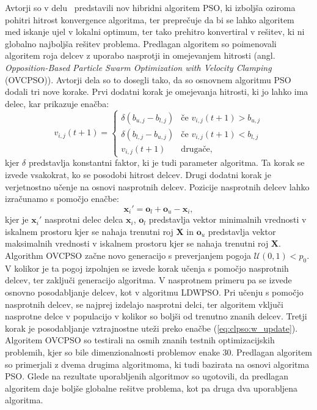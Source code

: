 Avtorji so v delu~\cite{alg:ovcpso} predstavili nov hibridni algoritem PSO, ki izboljša oziroma pohitri hitrost konvergence algoritma, ter preprečuje da bi se lahko algoritem med iskanje ujel v lokalni optimum, ter tako prehitro konvertiral v rešitev, ki ni globalno najboljša rešitev problema.
Predlagan algoritem so poimenovali algoritem roja delcev z uporabo nasprotji in omejevanjem hitrosti (angl. \textit{Opposition-Based Particle Swarm Optimization with Velocity Clamping} (OVCPSO)).
Avtorji dela so to dosegli tako, da so osnovnem algoritmu PSO dodali tri nove korake.
Prvi dodatni korak je omejevanja hitrosti, ki jo lahko ima delec, kar prikazuje enačba:
\begin{equation}
    v_{i,j}(t + 1) = \begin{cases}
        \delta (b_{u, j} - b_{l, j}) &\text{če } v_{i,j}(t + 1) > b_{u, j}\\
        \delta (b_{l, j} - b_{u, j}) &\text{če } v_{i,j}(t + 1) < b_{l, j}\\
        v_{i,j}(t + 1) &\text{drugače},
    \end{cases}
\end{equation}
kjer $\delta$ predstavlja konstantni faktor, ki je tudi parameter algoritma.
Ta korak se izvede vsakokrat, ko se posodobi hitrost delcev.
Drugi dodatni korak je verjetnostno učenje na osnovi nasprotnih delcev.
Pozicije nasprotnih delcev lahko izračunamo s pomočjo enačbe:
\begin{equation}
    \mathbf{x}_i' = \mathbf{o}_l + \mathbf{o}_u - \mathbf{x}_i, \label{eq:ovcpso:opposite_particle}
\end{equation} 
kjer je $\mathbf{x}_i'$ nasprotni delec delca $\mathbf{x}_i$, $\mathbf{o}_l$ predstavlja vektor minimalnih vrednosti v iskalnem prostoru kjer se nahaja trenutni roj $\mathbf{X}$ in $\mathbf{o}_u$ predstavlja vektor maksimalnih vrednosti v iskalnem prostoru kjer se nahaja trenutni roj $\mathbf{X}$.
Algorithm OVCPSO začne novo generacijo s preverjanjem pogoja $\mathcal{U}(0, 1) < p_0$.
V kolikor je ta pogoj izpolnjen se izvede korak učenja s pomočjo nasprotnih delcev, ter zaključi generacijo algoritma.
V nasprotnem primeru pa se izvede osnovno posodabljanje delcev, kot v algoritmu LDWPSO.
Pri učenju s pomočjo nasprotnih delcev, se najprej izdelajo nasprotni delci, ter algoritem vključi nasprotne delce v populacijo v kolikor so boljši od trenutno znanih delcev.
Tretji korak je posodabljanje vztrajnostne uteži preko enačbe (\ref{eq:clpso:w_update}).
Algoritem OVCPSO so testirali na osmih znanih testnih optimizacijskih problemih, kjer so bile dimenzionalnosti problemov enake $30$.
Predlagan algoritem so primerjali z dvema drugima algoritmoma, ki tudi bazirata na osnovi algoritma PSO.
Glede na rezultate uporabljenih algoritmov so ugotovili, da predlagan algoritem daje boljše globalne rešitve problema, kot pa druga dva uporabljena algoritma.

